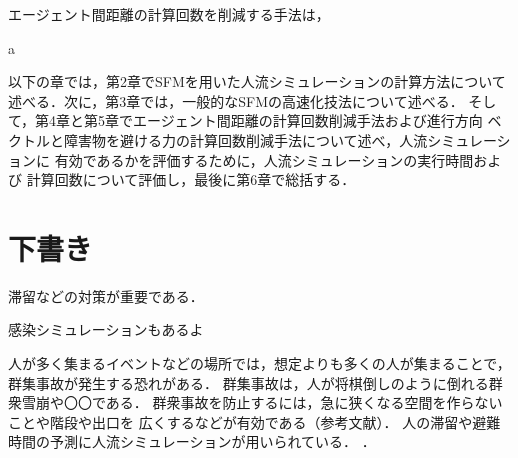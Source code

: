 エージェント間距離の計算回数を削減する手法は，


a

以下の章では，第2章でSFMを用いた人流シミュレーションの計算方法について
述べる．次に，第3章では，一般的なSFMの高速化技法について述べる．
そして，第4章と第5章でエージェント間距離の計算回数削減手法および進行方向
ベクトルと障害物を避ける力の計算回数削減手法について述べ，人流シミュレーションに
有効であるかを評価するために，人流シミュレーションの実行時間および
計算回数について評価し，最後に第6章で総括する．


\clearpage
\section{下書き}
滞留などの対策が重要である\cite{taisaku1}\cite{taisaku2}．

感染シミュレーションもあるよ\cite{mas_pandemic}

人が多く集まるイベントなどの場所では，想定よりも多くの人が集まることで，
群集事故が発生する恐れがある．
群集事故は，人が将棋倒しのように倒れる群衆雪崩や〇〇である．
群衆事故を防止するには，急に狭くなる空間を作らないことや階段や出口を
広くするなどが有効である（参考文献）．
人の滞留や避難時間の予測に人流シミュレーションが用いられている．
\cite{sim_jirei1}\cite{sim_jirei2}\cite{sim_jirei3}\cite{sim_jirei8}\cite{sim_jirei7}．

